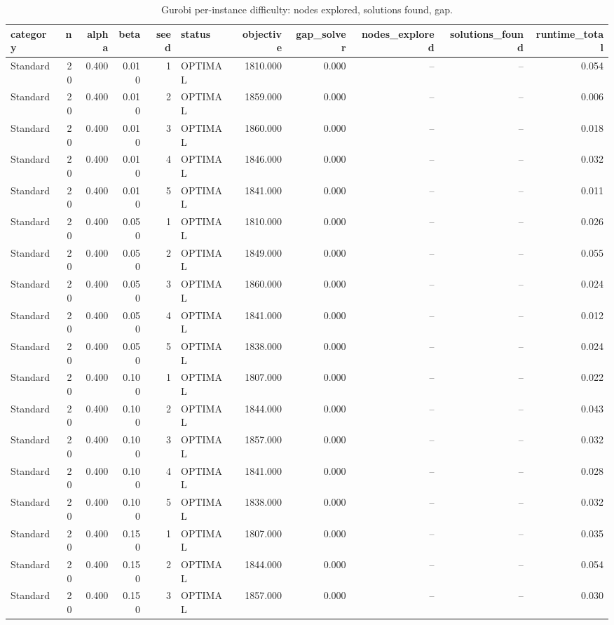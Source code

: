 \begin{table}
\caption{Gurobi per-instance difficulty: nodes explored, solutions found, gap.}
\label{tab:gurobi_difficulty}
\begin{tabular}{lrrrrlrrrrr}
\toprule
category & n & alpha & beta & seed & status & objective & gap\_solver & nodes\_explored & solutions\_found & runtime\_total \\
\midrule
Standard & 20 & 0.400 & 0.010 & 1 & OPTIMAL & 1810.000 & 0.000 & -- & -- & 0.054 \\
Standard & 20 & 0.400 & 0.010 & 2 & OPTIMAL & 1859.000 & 0.000 & -- & -- & 0.006 \\
Standard & 20 & 0.400 & 0.010 & 3 & OPTIMAL & 1860.000 & 0.000 & -- & -- & 0.018 \\
Standard & 20 & 0.400 & 0.010 & 4 & OPTIMAL & 1846.000 & 0.000 & -- & -- & 0.032 \\
Standard & 20 & 0.400 & 0.010 & 5 & OPTIMAL & 1841.000 & 0.000 & -- & -- & 0.011 \\
Standard & 20 & 0.400 & 0.050 & 1 & OPTIMAL & 1810.000 & 0.000 & -- & -- & 0.026 \\
Standard & 20 & 0.400 & 0.050 & 2 & OPTIMAL & 1849.000 & 0.000 & -- & -- & 0.055 \\
Standard & 20 & 0.400 & 0.050 & 3 & OPTIMAL & 1860.000 & 0.000 & -- & -- & 0.024 \\
Standard & 20 & 0.400 & 0.050 & 4 & OPTIMAL & 1841.000 & 0.000 & -- & -- & 0.012 \\
Standard & 20 & 0.400 & 0.050 & 5 & OPTIMAL & 1838.000 & 0.000 & -- & -- & 0.024 \\
Standard & 20 & 0.400 & 0.100 & 1 & OPTIMAL & 1807.000 & 0.000 & -- & -- & 0.022 \\
Standard & 20 & 0.400 & 0.100 & 2 & OPTIMAL & 1844.000 & 0.000 & -- & -- & 0.043 \\
Standard & 20 & 0.400 & 0.100 & 3 & OPTIMAL & 1857.000 & 0.000 & -- & -- & 0.032 \\
Standard & 20 & 0.400 & 0.100 & 4 & OPTIMAL & 1841.000 & 0.000 & -- & -- & 0.028 \\
Standard & 20 & 0.400 & 0.100 & 5 & OPTIMAL & 1838.000 & 0.000 & -- & -- & 0.032 \\
Standard & 20 & 0.400 & 0.150 & 1 & OPTIMAL & 1807.000 & 0.000 & -- & -- & 0.035 \\
Standard & 20 & 0.400 & 0.150 & 2 & OPTIMAL & 1844.000 & 0.000 & -- & -- & 0.054 \\
Standard & 20 & 0.400 & 0.150 & 3 & OPTIMAL & 1857.000 & 0.000 & -- & -- & 0.030 \\

\end{tabular}
\end{table}
